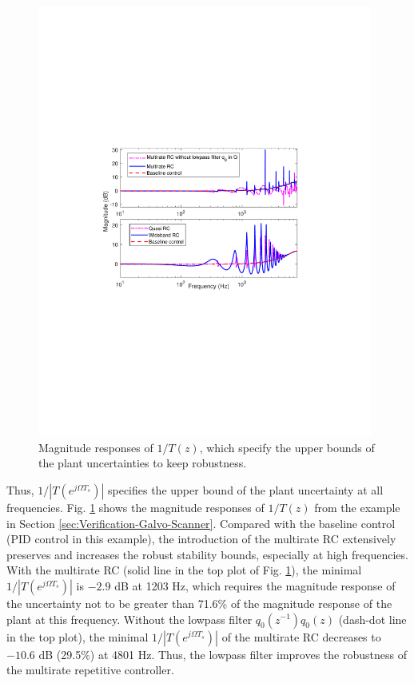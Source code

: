 \documentclass [11pt, proquest] {uwthesis}[2020/02/24]
\begin{document}
\begin{figure}[!ht]
\begin{centering}
\includegraphics[width=11cm]{Fractional-order-RC/stability_all}
\par\end{centering}
\caption{\label{fig:invT-multirate-RC}Magnitude responses of $1/T(z)$, which
specify the upper bounds of the plant uncertainties to keep robustness.}
\end{figure}

Thus, $1/|T(e^{j\Omega T_{s}})|$ specifies the upper bound of the
plant uncertainty at all frequencies. Fig. \ref{fig:invT-multirate-RC}
shows the magnitude responses of $1/T(z)$ from the example in Section
\ref{sec:Verification-Galvo-Scanner}. Compared with the baseline control
(PID control in this example), the introduction of the multirate RC
extensively preserves and increases the robust stability bounds, especially
at high frequencies. With the multirate RC (solid line in the top
plot of Fig. \ref{fig:invT-multirate-RC}), the minimal $1/|T(e^{j\Omega T_{s}})|$
is $-2.9$ dB at 1203 Hz, which requires the magnitude response of
the uncertainty not to be greater than 71.6\% of the magnitude response
of the plant at this frequency. Without the lowpass filter $q_{0}(z^{-1})q_{0}(z)$
(dash-dot line in the top plot), the minimal $1/|T(e^{j\Omega T_{s}})|$
of the multirate RC decreases to $-10.6$ dB (29.5\%) at 4801 Hz.
Thus, the lowpass filter improves the robustness of the multirate
repetitive controller.
\end{document}
